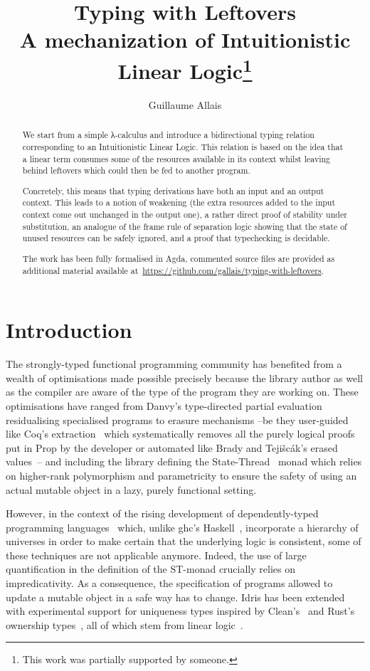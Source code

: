 \documentclass[a4paper,UKenglish]{lipics-v2016}
\title{Typing with Leftovers \protect\\
{\Large A mechanization of Intuitionistic Linear Logic\footnote{This work was partially supported by someone.}}}
\author[1]{Guillaume Allais}
\affil[1]{Nijmegen Quantum Logic Group ─ Radboud University\\
  \texttt{gallais@cs.ru.nl}}
\begin{document}
\maketitle

\begin{abstract}
We start from a simple λ-calculus and introduce a bidirectional 
typing relation corresponding to an Intuitionistic Linear Logic. This 
relation is based on the idea that a linear term consumes some of the
resources available in its context whilst leaving behind leftovers
which could then be fed to another program. 

Concretely, this means that typing derivations have both an input 
and an output context. This leads to a notion of weakening (the extra
resources added to the input context come out unchanged in the output
one), a rather direct proof of stability under substitution, an
analogue of the frame rule of separation logic showing that the 
state of unused resources can be safely ignored, and a proof that
typechecking is decidable.

The work has been fully formalised in Agda, commented source files 
are provided as additional material available at~\url{https://github.com/gallais/typing-with-leftovers}.
\end{abstract}

\section{Introduction}

The strongly-typed functional programming community has benefited from
a wealth of optimisations made possible precisely because the library
author as well as the compiler are aware of the type of the program they
are working on. These optimisations have ranged from Danvy's type-directed
partial evaluation~\cite{Danvy1999Type} residualising specialised programs
to erasure mechanisms --be they user-guided like Coq's extraction~\cite{letouzey2002new}
which systematically removes all the purely logical proofs put in Prop by
the developer or automated like Brady and Teji{\v{s}}c{\'a}k's erased
values~\cite{brady2003inductive,bradypractical}-- and including the library
defining the State-Thread~\cite{launchbury1994lazy} monad which relies on
higher-rank polymorphism and parametricity to ensure the safety of using an
actual mutable object in a lazy, purely functional setting.

However, in the context of the rising development of dependently-typed
programming languages~\cite{Brady2013idris, norell2009dependently} which,
unlike ghc's Haskell~\cite{weirich2013towards}, incorporate a hierarchy
of universes in order to make certain that the underlying logic is consistent,
some of these techniques are not applicable anymore. Indeed, the use of
large quantification in the definition of the ST-monad crucially relies
on impredicativity. As a consequence, the specification of programs
allowed to update a mutable object in a safe way has to change.
Idris has been extended with experimental support for uniqueness types
inspired by Clean's~\cite{achten1993high} and Rust's ownership types~\cite{manual:rust},
all of which stem from linear logic~\cite{girard1987linear}.
\end{document}
